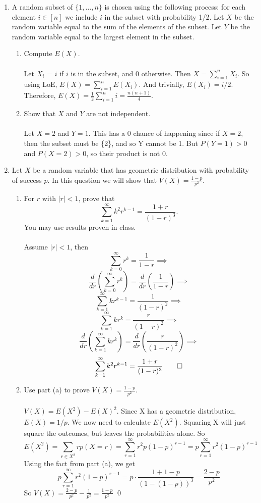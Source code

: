 \documentclass[12pt]{article}
\begin{document}
\begin{enumerate}
\medskip

\item A random subset of $\{1, \ldots, n\}$ is chosen using the following process: for each element $i \in [n]$ we include $i$ in the subset with probability 1/2. Let $X$ be the random variable equal to the sum of the elements of the subset. Let $Y$ be the random variable equal to the largest element in the subset.

\begin{enumerate}
\item Compute $E(X)$.\\\\
Let $X_i$ = $i$ if $i$ is in the subset, and 0 otherwise. Then $X = \sum_{i=1}^n X_i$. So using LoE, $E(X) = \sum_{i=1}^{n} E(X_i)$. And trivially, $E(X_i) = i/2$. Therefore, $E(X) = \frac{1}{2}\sum_{i=1}^{n} i = \frac{n(n+1)}{4}$.\\
\item Show that $X$ and $Y$ are not independent. \\\\
Let $X=2$ and $Y=1$. This has a 0 chance of happening since if $X=2$, then the subset must be \{2\}, and so Y cannot be 1. But $P(Y=1)>0$ and $P(X=2)>0$, so their product is not 0. \qedsymbol
\end{enumerate}


\medskip

\item Let $X$ be a random variable that has geometric distribution with probability of success $p$. In this question we will show that $V(X) = \frac{1-p}{p^2}$.

\begin{enumerate}
\item For $r$ with $|r| < 1$, prove that \[\sum_{k=1}^\infty k^2 r^{k-1} = \frac{1+r}{(1-r)^3}.\] You may use results proven in class.\\\\
Assume $|r| < 1$, then
\[\sum_{k=0}^\infty r^k = \frac{1}{1-r} \implies\]
\[\frac{d}{dr}(\sum_{k=0}^\infty r^k) = \frac{d}{dr}(\frac{1}{1-r}) \implies\]
\[\sum_{k=1}^\infty kr^{k-1} = \frac{1}{(1-r)^2} \implies\]
\[\sum_{k=1}^\infty kr^{k} = \frac{r}{(1-r)^2} \implies\]
\[\frac{d}{dr}(\sum_{k=1}^\infty kr^k) = \frac{d}{dr}(\frac{r}{(1-r)^2}) \implies\]
\[\sum_{k=1}^\infty k^2r^{k-1} = \frac{1+r}{(1-r)^3} \qed\]

\item Use part (a) to prove $V(X) = \frac{1-p}{p^2}$.\\\\
$V(X)=E(X^2)-E(X)^2$. Since X has a geometric distribution, $E(X) = 1/p$. We now need to calculate $E(X^2)$. Squaring X will just square the outcomes, but leaves the probabilities alone. So 
\[E(X^2) = \sum_{r \in X^2} rp(X=r) = \sum_{r=1}^\infty r^2 p(1-p)^{r-1} = p\sum_{r=1}^\infty r^2 (1-p)^{r-1}\]
Using the fact from part (a), we get
\[p\sum_{r=1}^\infty r^2 (1-p)^{r-1} = p\cdot \frac{1+1-p}{(1-(1-p))^3} = \frac{2-p}{p^2} \]
So $V(X) = \frac{2-p}{p^2} - \frac{1}{p^2} = \frac{1-p}{p^2}$ \qed
\end{enumerate}


\end{enumerate}
\end{document}
